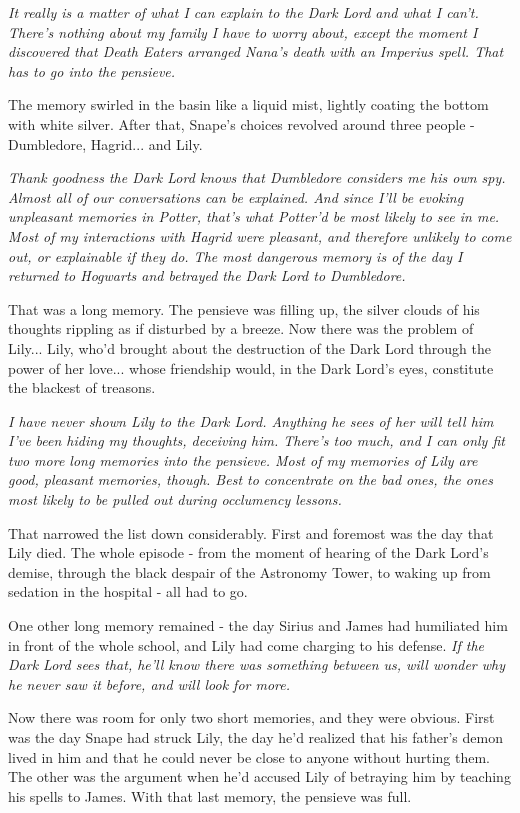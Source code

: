\documentclass[a4paper,11pt]{article}
\begin{document}
\emph{It really is a matter of what I can explain to the Dark Lord and what I can't. There's nothing about my family I have to worry about, except the moment I discovered that Death Eaters arranged Nana's death with an Imperius spell. That has to go into the pensieve.}

The memory swirled in the basin like a liquid mist, lightly coating the bottom with white silver. After that, Snape's choices revolved around three people - Dumbledore, Hagrid... and Lily.

\emph{Thank goodness the Dark Lord knows that Dumbledore considers me his own spy. Almost all of our conversations can be explained. And since I'll be evoking unpleasant memories in Potter, that's what Potter'd be most likely to see in me. Most of my interactions with Hagrid were pleasant, and therefore unlikely to come out, or explainable if they do. The most dangerous memory is of the day I returned to Hogwarts and betrayed the Dark Lord to Dumbledore.}

That was a long memory. The pensieve was filling up, the silver clouds of his thoughts rippling as if disturbed by a breeze. Now there was the problem of Lily... Lily, who'd brought about the destruction of the Dark Lord through the power of her love... whose friendship would, in the Dark Lord's eyes, constitute the blackest of treasons.

\emph{I have never shown Lily to the Dark Lord. Anything he sees of her will tell him I've been hiding my thoughts, deceiving him. There's too much, and I can only fit two more long memories into the pensieve. Most of my memories of Lily are good, pleasant memories, though. Best to concentrate on the bad ones, the ones most likely to be pulled out during occlumency lessons.}

That narrowed the list down considerably. First and foremost was the day that Lily died. The whole episode - from the moment of hearing of the Dark Lord's demise, through the black despair of the Astronomy Tower, to waking up from sedation in the hospital - all had to go.

One other long memory remained - the day Sirius and James had humiliated him in front of the whole school, and Lily had come charging to his defense. \emph{If the Dark Lord sees that, he'll know there was something between us, will wonder why he never saw it before, and will look for more.}

Now there was room for only two short memories, and they were obvious. First was the day Snape had struck Lily, the day he'd realized that his father's demon lived in him and that he could never be close to anyone without hurting them. The other was the argument when he'd accused Lily of betraying him by teaching his spells to James. With that last memory, the pensieve was full.
\end{document}
